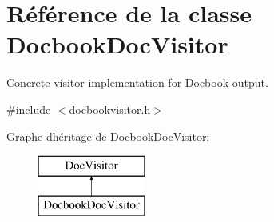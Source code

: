 \hypertarget{class_docbook_doc_visitor}{}\section{Référence de la classe Docbook\+Doc\+Visitor}
\label{class_docbook_doc_visitor}


Concrete visitor implementation for Docbook output.  




{\ttfamily \#include $<$docbookvisitor.\+h$>$}

Graphe d\textquotesingle{}héritage de Docbook\+Doc\+Visitor\+:\begin{figure}[H]
\begin{center}
\leavevmode
\includegraphics[height=2.000000cm]{class_docbook_doc_visitor}
\end{center}
\end{figure}
